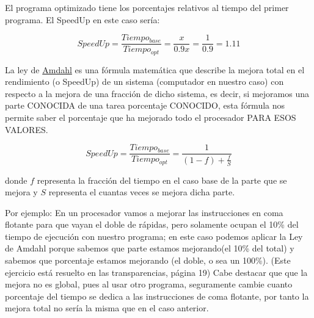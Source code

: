 \documentclass[12pt,onecolumn]{memoir}
\begin{document}
\begin{center}
\end{center}

El programa optimizado tiene los porcentajes relativos al tiempo del
primer programa. El SpeedUp en este caso sería:

\[ SpeedUp = \frac{Tiempo_{base}}{Tiempo_{opt}} = \frac{x}{0.9x} = \frac{1}{0.9} = 1.11 \]



La ley de \href{https://es.wikipedia.org/wiki/Gene_Amdahl}{Amdahl} es una 
fórmula matemática que describe la mejora total en el rendimiento (o SpeedUp) de un 
sistema (computador en nuestro caso) con respecto a la mejora de una fracción 
de dicho sistema, es decir, si mejoramos una parte CONOCIDA de una
tarea 
porcentaje CONOCIDO, esta fórmula nos permite saber el porcentaje que ha mejorado
todo el procesador PARA ESOS VALORES.

\[ SpeedUp = \frac{Tiempo_{base}}{Tiempo_{opt}} = \frac{1}{(1 - f) + \frac{f}{S}} \]

donde $f$ representa la fracción del tiempo en el caso base de la
parte que se mejora y $S$ representa el cuantas veces se mejora dicha parte. 

Por ejemplo: En un procesador vamos a mejorar las instrucciones en coma flotante para
que vayan el doble de rápidas, pero solamente ocupan el 10\% del tiempo de ejecución 
con nuestro programa; en este caso podemos aplicar la Ley de Amdahl porque sabemos que
parte estamos mejorando(el 10\% del total) y sabemos que porcentaje estamos mejorando
(el doble, o sea un 100\%).
(Este ejercicio está resuelto en las transparencias, página 19) %
Cabe destacar que que la mejora no es global, pues al usar otro programa, seguramente
cambie cuanto porcentaje del tiempo se dedica a las instrucciones de coma flotante,
por tanto la mejora total no sería la misma que en el caso anterior.
\end{document}
